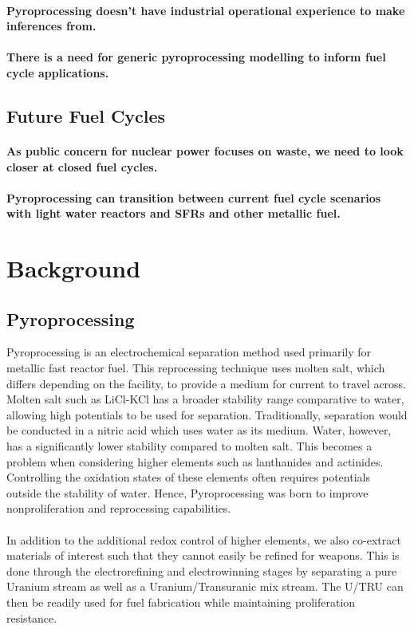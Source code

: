 \paragraph{Pyroprocessing doesn't have industrial operational experience to make inferences from.}

\paragraph{There is a need for generic pyroprocessing modelling to inform fuel cycle applications.}

\subsection{Future Fuel Cycles}

\paragraph{As public concern for nuclear power focuses on waste, we need to look closer at closed fuel cycles.}

\paragraph{Pyroprocessing can transition between current fuel cycle scenarios with light water reactors and SFRs and other metallic fuel.}


\section{Background}
\subsection{Pyroprocessing}
Pyroprocessing is an electrochemical separation method used primarily for metallic fast reactor fuel.
This reprocessing technique uses molten salt, which differs depending on the facility, to provide a medium for current to travel across.
Molten salt such as LiCl-KCl has a broader stability range comparative to water, allowing high potentials to be used for separation.
Traditionally, separation would be conducted in a nitric acid which uses water as its medium.
Water, however, has a significantly lower stability compared to molten salt.
This becomes a problem when considering higher elements such as lanthanides and actinides.
Controlling the oxidation states of these elements often requires potentials outside the stability of water.
Hence, Pyroprocessing was born to improve nonproliferation and reprocessing capabilities.
\\ \\
In addition to the additional redox control of higher elements, we also co-extract materials of interest such that they cannot easily be refined for weapons.
This is done through the electrorefining and electrowinning stages by separating a pure Uranium stream as well as a Uranium/Transuranic mix stream. 
The U/TRU can then be readily used for fuel fabrication while maintaining proliferation resistance.


